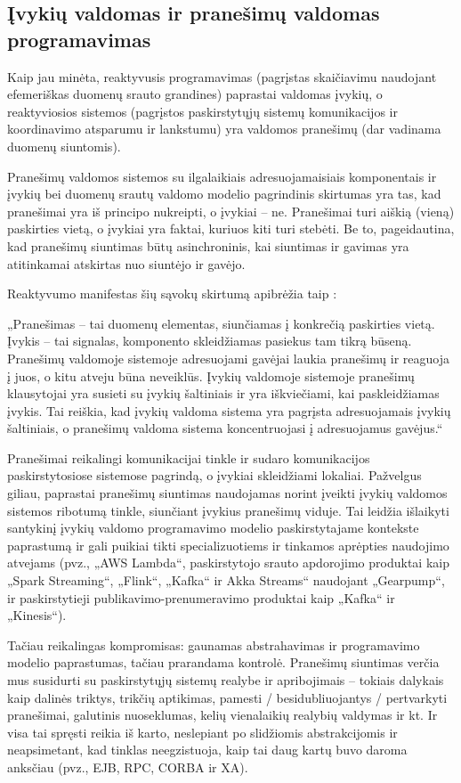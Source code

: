 \subsection{Įvykių valdomas ir pranešimų valdomas programavimas}

Kaip jau minėta, reaktyvusis programavimas (pagrįstas skaičiavimu naudojant efemeriškas duomenų srauto grandines) paprastai valdomas įvykių, o reaktyviosios sistemos (pagrįstos paskirstytųjų sistemų komunikacijos ir koordinavimo atsparumu ir lankstumu) yra valdomos pranešimų (dar vadinama duomenų siuntomis).

Pranešimų valdomos sistemos su ilgalaikiais adresuojamaisiais komponentais ir įvykių bei duomenų srautų valdomo modelio pagrindinis skirtumas yra tas, kad pranešimai yra iš principo nukreipti, o įvykiai – ne. Pranešimai turi aiškią (vieną) paskirties vietą, o įvykiai yra faktai, kuriuos kiti turi stebėti. Be to, pageidautina, kad pranešimų siuntimas būtų asinchroninis, kai siuntimas ir gavimas yra atitinkamai atskirtas nuo siuntėjo ir gavėjo.

Reaktyvumo manifestas šių sąvokų skirtumą apibrėžia taip \cite{ReactiveManifesto}:

„Pranešimas – tai duomenų elementas, siunčiamas į konkrečią paskirties vietą. Įvykis – tai signalas, komponento skleidžiamas pasiekus tam tikrą būseną. Pranešimų valdomoje sistemoje adresuojami gavėjai laukia pranešimų ir reaguoja į juos, o kitu atveju būna neveiklūs. Įvykių valdomoje sistemoje pranešimų klausytojai yra susieti su įvykių šaltiniais ir yra iškviečiami, kai paskleidžiamas įvykis. Tai reiškia, kad įvykių valdoma sistema yra pagrįsta adresuojamais įvykių šaltiniais, o pranešimų valdoma sistema koncentruojasi į adresuojamus gavėjus.“

Pranešimai reikalingi komunikacijai tinkle ir sudaro komunikacijos paskirstytosiose sistemose pagrindą, o įvykiai skleidžiami lokaliai. Pažvelgus giliau, paprastai pranešimų siuntimas naudojamas norint įveikti įvykių valdomos sistemos ribotumą tinkle, siunčiant įvykius pranešimų viduje. Tai leidžia išlaikyti santykinį įvykių valdomo programavimo modelio paskirstytajame kontekste paprastumą ir gali puikiai tikti specializuotiems ir tinkamos aprėpties naudojimo atvejams (pvz., „AWS Lambda“, paskirstytojo srauto apdorojimo produktai kaip „Spark Streaming“, „Flink“, „Kafka“ ir Akka Streams“ naudojant „Gearpump“, ir paskirstytieji publikavimo-prenumeravimo produktai kaip „Kafka“ ir „Kinesis“).

Tačiau reikalingas kompromisas: gaunamas abstrahavimas ir programavimo modelio paprastumas, tačiau prarandama kontrolė. Pranešimų siuntimas verčia mus susidurti su paskirstytųjų sistemų realybe ir apribojimais – tokiais dalykais kaip dalinės triktys, trikčių aptikimas, pamesti / besidubliuojantys / pertvarkyti pranešimai, galutinis nuoseklumas, kelių vienalaikių realybių valdymas ir kt. Ir visa tai spręsti reikia iš karto, neslepiant po slidžiomis abstrakcijomis ir neapsimetant, kad tinklas neegzistuoja, kaip tai daug kartų buvo daroma anksčiau (pvz., EJB, RPC, CORBA ir XA).

